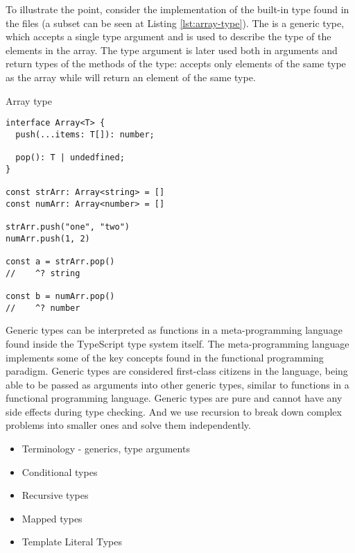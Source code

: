 To illustrate the point, consider the implementation of the built-in  type found in the  files (a subset can be seen at Listing \ref{lst:array-type}). The  is a generic type, which accepts a single type argument  and is used to describe the type of the elements in the array. The type argument  is later used both in arguments and return types of the methods of the  type:  accepts only elements of the same type as the array while  will return an element of the same type.

\begin{listing}[h]
  \caption{Array type}\label{lst:array-type}
  \begin{verbatim}
interface Array<T> {
  push(...items: T[]): number;

  pop(): T | undedfined;
}

const strArr: Array<string> = []
const numArr: Array<number> = []

strArr.push("one", "two")
numArr.push(1, 2)

const a = strArr.pop()
//    ^? string

const b = numArr.pop()
//    ^? number
\end{verbatim}
\end{listing}

Generic types can be interpreted as functions in a meta-programming language found inside the TypeScript type system itself. The meta-programming language implements some of the key concepts found in the functional programming paradigm. Generic types are considered first-class citizens in the language, being able to be passed as arguments into other generic types, similar to functions in a functional programming language. Generic types are pure and cannot have any side effects during type checking. And we use recursion to break down complex problems into smaller ones and solve them independently.


\begin{itemize}
  \item Terminology - generics, type arguments
  \item Conditional types
  \item Recursive types
  \item Mapped types
  \item Template Literal Types
\end{itemize}

